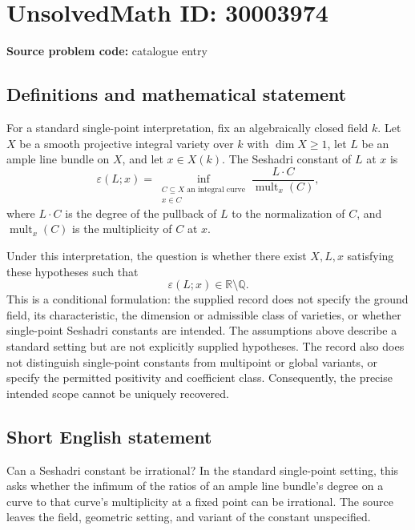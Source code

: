 \documentclass[11pt]{article}
\newcommand{\Q}{\mathbb{Q}}
\newcommand{\R}{\mathbb{R}}
\begin{document}
\section*{UnsolvedMath ID: 30003974}
\textbf{Source problem code:} catalogue entry
\subsection{Definitions and mathematical statement}
For a standard single-point interpretation, fix an algebraically closed field \(k\). Let \(X\) be a smooth projective integral variety over \(k\) with \(\dim X\geq 1\), let \(L\) be an ample line bundle on \(X\), and let \(x\in X(k)\). The Seshadri constant of \(L\) at \(x\) is
\[
\varepsilon(L;x)=\inf_{\substack{C\subseteq X\text{ an integral curve}\\x\in C}}\frac{L\cdot C}{\operatorname{mult}_x(C)},
\]
where \(L\cdot C\) is the degree of the pullback of \(L\) to the normalization of \(C\), and \(\operatorname{mult}_x(C)\) is the multiplicity of \(C\) at \(x\).

Under this interpretation, the question is whether there exist \(X,L,x\) satisfying these hypotheses such that
\[
\varepsilon(L;x)\in\R\setminus\Q.
\]
This is a conditional formulation: the supplied record does not specify the ground field, its characteristic, the dimension or admissible class of varieties, or whether single-point Seshadri constants are intended. The assumptions above describe a standard setting but are not explicitly supplied hypotheses. The record also does not distinguish single-point constants from multipoint or global variants, or specify the permitted positivity and coefficient class. Consequently, the precise intended scope cannot be uniquely recovered.
\subsection{Short English statement}
Can a Seshadri constant be irrational? In the standard single-point setting, this asks whether the infimum of the ratios of an ample line bundle's degree on a curve to that curve's multiplicity at a fixed point can be irrational. The source leaves the field, geometric setting, and variant of the constant unspecified.
\end{document}
